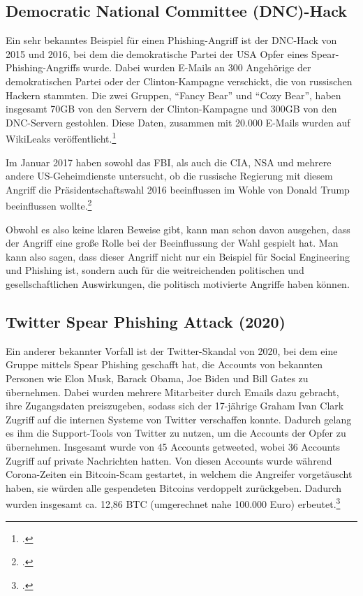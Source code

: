 \documentclass[12pt, a4paper, oneside]{scrartcl}
\begin{document}
\subsection{Democratic National Committee (DNC)-Hack}
Ein sehr bekanntes Beispiel für einen Phishing-Angriff ist der DNC-Hack von 2015 und 2016, 
bei dem die demokratische Partei der USA Opfer eines Spear-Phishing-Angriffs wurde. 
Dabei wurden E-Mails an 300 Angehörige der demokratischen Partei oder der Clinton-Kampagne
verschickt, die von russischen Hackern stammten. Die zwei Gruppen, ``Fancy Bear'' und ``Cozy Bear'',
haben insgesamt 70GB von den Servern der Clinton-Kampagne und 300GB von den DNC-Servern gestohlen.
Diese Daten, zusammen mit 20.000 E-Mails wurden auf WikiLeaks veröffentlicht.\footcite{IDStrong_DNC}
\par
Im Januar 2017 haben sowohl das FBI, als auch die CIA, NSA und mehrere andere US-Geheimdienste
untersucht, ob die russische Regierung mit diesem Angriff die Präsidentschaftswahl 2016 beeinflussen 
im Wohle von Donald Trump beeinflussen wollte.\footcite{NYT_DNC}
\par
Obwohl es also keine klaren Beweise gibt, kann man schon davon ausgehen, dass der Angriff eine 
große Rolle bei der Beeinflussung der Wahl gespielt hat. Man kann also sagen, dass dieser Angriff 
nicht nur ein Beispiel für Social Engineering und Phishing ist, sondern auch für die weitreichenden 
politischen und gesellschaftlichen Auswirkungen, die politisch motivierte Angriffe haben können.

\subsection{Twitter Spear Phishing Attack (2020)}

Ein anderer bekannter Vorfall ist der Twitter-Skandal von 2020, bei dem eine Gruppe mittels Spear Phishing geschafft
hat, die Accounts von bekannten Personen wie Elon Musk, Barack Obama, Joe Biden und Bill Gates zu übernehmen.
Dabei wurden mehrere Mitarbeiter durch Emails dazu gebracht, ihre Zugangsdaten preiszugeben, sodass sich 
der 17-jährige Graham Ivan Clark Zugriff auf die internen Systeme von Twitter verschaffen konnte. Dadurch gelang
es ihm die Support-Tools von Twitter zu nutzen, um die Accounts der Opfer zu übernehmen. Insgesamt wurde von 45 Accounts
getweeted, wobei 36 Accounts Zugriff auf private Nachrichten hatten. Von diesen Accounts wurde während Corona-Zeiten 
ein Bitcoin-Scam gestartet, in welchem die Angreifer vorgetäuscht haben, sie würden alle gespendeten Bitcoins verdoppelt
zurückgeben. Dadurch wurden insgesamt ca. 12,86 BTC (umgerechnet nahe 100.000 Euro) erbeutet.\footcite{teampw_TwitterPhishing}\\
\end{document}
